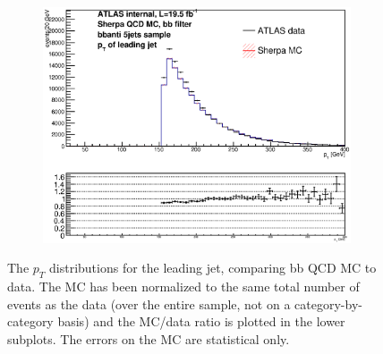 \begin{figure}[phtb!]
\begin{center}
  \begin{subfigure}[$bbanti$ 5+ jet category]{0.3\textwidth}\includegraphics[width=\textwidth]{MonteCarlo/figures/pt0_bbanti_5jets.eps}\end{subfigure}
  \caption{The $p_T$ distributions for the leading jet, comparing bb QCD MC to data.  The MC has been normalized
  to the same total number of events as the data (over the entire sample, not on a category-by-category basis)
  and the MC/data ratio is plotted in the lower subplots.  The errors on the MC are statistical only.
  \label{fig:bb_qcd_mc_pt0}}
    \end{center}
\end{figure}



